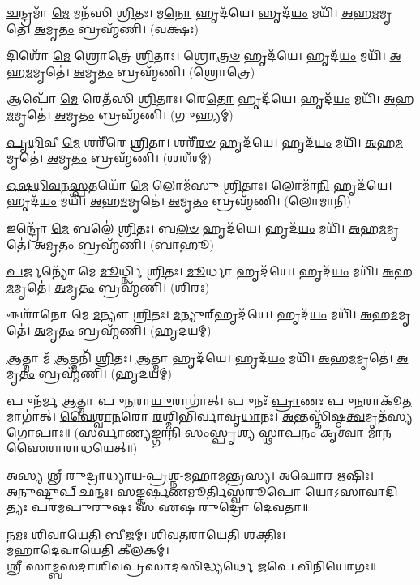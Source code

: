    \ul{𑌚}\-𑌨𑍍𑌦𑍍𑌰𑌮𑌾᳴ \ul{𑌮𑍇} 𑌮𑌨᳴𑌸𑌿 \ul{𑌶𑍍𑌰𑌿}\-𑌤𑌃।   𑌮\-\ul{𑌨𑍋} 𑌹𑍃𑌦᳴𑌯𑍇।   𑌹𑍃𑌦᳴\-\ul{𑌯𑌂} 𑌮𑌯𑌿᳴।   \ul{𑌅}\-𑌹\-\ul{𑌮}\-𑌮𑍃𑌤𑍇॑।   \ul{𑌅}\-𑌮𑍃\-\ul{𑌤𑌂} 𑌬𑍍𑌰𑌹𑍍𑌮᳴𑌣𑌿। (𑌵𑌕𑍍𑌷𑌃)

   𑌦𑌿𑌶𑍋᳴ \ul{𑌮𑍇} 𑌶𑍍𑌰𑍋𑌤𑍍𑌰𑍇॑ \ul{𑌶𑍍𑌰𑌿}\-𑌤𑌾𑌃।   𑌶𑍍𑌰𑍋\-\ul{𑌤𑍍𑌰}\-\-\ul{𑍞} 𑌹𑍃𑌦᳴𑌯𑍇।   𑌹𑍃𑌦᳴\-\ul{𑌯𑌂} 𑌮𑌯𑌿᳴।   \ul{𑌅}\-𑌹\-\ul{𑌮}\-𑌮𑍃𑌤𑍇॑।   \ul{𑌅}\-𑌮𑍃\-\ul{𑌤𑌂} 𑌬𑍍𑌰𑌹𑍍𑌮᳴𑌣𑌿। (𑌶𑍍𑌰𑍋𑌤𑍍𑌰𑍇)

   𑌆𑌪𑍋᳴ \ul{𑌮𑍇} 𑌰𑍇𑌤᳴𑌸𑌿 \ul{𑌶𑍍𑌰𑌿}\-𑌤𑌾𑌃।   𑌰𑍇\-\ul{𑌤𑍋} 𑌹𑍃𑌦᳴𑌯𑍇।   𑌹𑍃𑌦᳴\-\ul{𑌯𑌂} 𑌮𑌯𑌿᳴।   \ul{𑌅}\-𑌹\-\ul{𑌮}\-𑌮𑍃𑌤𑍇॑।   \ul{𑌅}\-𑌮𑍃\-\ul{𑌤𑌂} 𑌬𑍍𑌰𑌹𑍍𑌮᳴𑌣𑌿। (𑌗𑍁𑌹𑍍𑌯𑌮𑍍)

   \ul{𑌪𑍃}\-\-\ul{𑌥𑌿}\-𑌵𑍀 \ul{𑌮𑍇} 𑌶𑌰𑍀᳴𑌰𑍇 \ul{𑌶𑍍𑌰𑌿}\-𑌤𑌾।   𑌶𑌰𑍀᳴\-\ul{𑌰}\-\-\ul{𑍞} 𑌹𑍃𑌦᳴𑌯𑍇।   𑌹𑍃𑌦᳴\-\ul{𑌯𑌂} 𑌮𑌯𑌿᳴।   \ul{𑌅}\-𑌹\-\ul{𑌮}\-𑌮𑍃𑌤𑍇॑।   \ul{𑌅}\-𑌮𑍃\-\ul{𑌤𑌂} 𑌬𑍍𑌰𑌹𑍍𑌮᳴𑌣𑌿। (𑌶𑌰𑍀𑌰𑌮𑍍)

   \ul{𑌓}\-\-\ul{𑌷}\-\-\ul{𑌧𑌿}\-\-\ul{𑌵}\-\-\ul{𑌨}\-\-\ul{𑌸𑍍𑌪}\-𑌤𑌯𑍋᳴ \ul{𑌮𑍇} 𑌲𑍋𑌮᳴𑌸𑍁 \ul{𑌶𑍍𑌰𑌿}\-𑌤𑌾𑌃।   𑌲𑍋𑌮𑌾᳴\-\ul{𑌨𑌿} 𑌹𑍃𑌦᳴𑌯𑍇।   𑌹𑍃𑌦᳴\-\ul{𑌯𑌂} 𑌮𑌯𑌿᳴।   \ul{𑌅}\-𑌹\-\ul{𑌮}\-𑌮𑍃𑌤𑍇॑।   \ul{𑌅}\-𑌮𑍃\-\ul{𑌤𑌂} 𑌬𑍍𑌰𑌹𑍍𑌮᳴𑌣𑌿। (𑌲𑍋𑌮𑌾𑌨𑌿)

   𑌇𑌨𑍍𑌦𑍍𑌰𑍋᳴ \ul{𑌮𑍇} 𑌬𑌲𑍇॑ \ul{𑌶𑍍𑌰𑌿}\-𑌤𑌃।   𑌬\-\ul{𑌲}\-\-\ul{𑍞} 𑌹𑍃𑌦᳴𑌯𑍇।   𑌹𑍃𑌦᳴\-\ul{𑌯𑌂} 𑌮𑌯𑌿᳴।   \ul{𑌅}\-𑌹\-\ul{𑌮}\-𑌮𑍃𑌤𑍇॑।   \ul{𑌅}\-𑌮𑍃\-\ul{𑌤𑌂} 𑌬𑍍𑌰𑌹𑍍𑌮᳴𑌣𑌿। (𑌬𑌾𑌹𑍂)

   \ul{𑌪}\-𑌰𑍍𑌜𑌨𑍍𑌯𑍋᳴ 𑌮𑍇 \ul{𑌮𑍂}\-𑌰𑍍𑌧𑍍𑌨𑌿 \ul{𑌶𑍍𑌰𑌿}\-𑌤𑌃।   \ul{𑌮𑍂}\-𑌰𑍍𑌧𑌾 𑌹𑍃𑌦᳴𑌯𑍇।   𑌹𑍃𑌦᳴\-\ul{𑌯𑌂} 𑌮𑌯𑌿᳴।   \ul{𑌅}\-𑌹\-\ul{𑌮}\-𑌮𑍃𑌤𑍇॑।   \ul{𑌅}\-𑌮𑍃\-\ul{𑌤𑌂} 𑌬𑍍𑌰𑌹𑍍𑌮᳴𑌣𑌿। (𑌶𑌿𑌰𑌃)

   𑌈𑌶𑌾᳴𑌨𑍋 𑌮𑍇 \ul{𑌮}\-𑌨𑍍𑌯𑍗 \ul{𑌶𑍍𑌰𑌿}\-𑌤𑌃।   \ul{𑌮}\-𑌨𑍍𑌯𑍁𑌰𑍍‌𑌹𑍃𑌦᳴𑌯𑍇।   𑌹𑍃𑌦᳴\-\ul{𑌯𑌂} 𑌮𑌯𑌿᳴।    \ul{𑌅}\-𑌹\-\ul{𑌮}\-𑌮𑍃𑌤𑍇॑।   \ul{𑌅}\-𑌮𑍃\-\ul{𑌤𑌂} 𑌬𑍍𑌰𑌹𑍍𑌮᳴𑌣𑌿। (𑌹𑍃𑌦𑌯𑌮𑍍)

   \ul{𑌆}\-𑌤𑍍𑌮𑌾 𑌮᳴ \ul{𑌆}\-𑌤𑍍𑌮𑌨𑌿᳴ \ul{𑌶𑍍𑌰𑌿}\-𑌤𑌃।   \ul{𑌆}\-𑌤𑍍𑌮𑌾 𑌹𑍃𑌦᳴𑌯𑍇।   𑌹𑍃𑌦᳴\-\ul{𑌯𑌂} 𑌮𑌯𑌿᳴।   \ul{𑌅}\-𑌹\-\ul{𑌮}\-𑌮𑍃𑌤𑍇॑।   \ul{𑌅}\-𑌮𑍃\-\ul{𑌤𑌂} 𑌬𑍍𑌰𑌹𑍍𑌮᳴𑌣𑌿।
(𑌹𑍃𑌦𑌯𑌮𑍍)

   𑌪𑍁𑌨᳴𑌰𑍍𑌮 \ul{𑌆}\-𑌤𑍍𑌮𑌾 𑌪𑍁\-\ul{𑌨}\-𑌰𑌾\-\ul{𑌯𑍁}\-𑌰𑌾𑌗𑌾॑𑌤𑍍।   𑌪𑍁𑌨𑌃᳴ \ul{𑌪𑍍𑌰𑌾}\-𑌣𑌃 𑌪𑍁\-\ul{𑌨}\-𑌰𑌾𑌕𑍂᳴\-\ul{𑌤}\-𑌮𑌾𑌗𑌾॑𑌤𑍍।   \ul{𑌵𑍈}\-\-\ul{𑌶𑍍𑌵𑌾}\-\-\ul{𑌨}\-𑌰𑍋 \ul{𑌰}\-𑌶𑍍𑌮𑌿𑌭𑌿᳴𑌰𑍍𑌵𑌾𑌵𑍃\-\ul{𑌧𑌾}\-𑌨𑌃।   \ul{𑌅}\-𑌨𑍍𑌤𑌸𑍍𑌤𑌿᳴𑌷𑍍𑌠\-\ul{𑌤𑍍𑌵}\-𑌮𑍃𑌤᳴𑌸𑍍𑌯 \ul{𑌗𑍋}\-𑌪𑌾𑌃॥ (𑌸𑌰𑍍𑌵𑌾𑌣𑍍𑌯𑌙𑍍𑌗𑌾𑌨𑌿 𑌸𑌂𑌸𑍍𑌪𑍃𑌶𑍍𑌯 𑌸𑍍𑌥𑌾𑌪𑌨𑌂 𑌕𑍃𑌤𑍍𑌵𑌾 𑌮𑌾𑌨𑌸𑍈𑌰𑌾𑌰𑌾𑌧𑌯𑍇𑌤𑍍॥)
{\closesection}


𑌅𑌸𑍍𑌯 𑌶𑍍𑌰𑍀 𑌰𑍁𑌦𑍍𑌰𑌾𑌧𑍍𑌯𑌾𑌯-𑌪𑍍𑌰𑌶𑍍𑌨-𑌮𑌹𑌾𑌮𑌨𑍍𑌤𑍍𑌰𑌸𑍍𑌯। 𑌅𑌘𑍋𑌰 𑌋𑌷𑌿𑌃।\\
𑌅𑌨𑍁𑌷𑍍𑌟𑍁𑌪𑍍 𑌛𑌨𑍍𑌦𑌃। 𑌸𑌙𑍍𑌕𑌰𑍍𑌷𑌣𑌮𑍂𑌰𑍍𑌤𑌿𑌸𑍍𑌵𑌰𑍂𑌪𑍋 𑌯𑍋𑌽𑌸𑌾𑌵𑌾𑌦𑌿𑌤𑍍𑌯𑌃 𑌪𑌰𑌮𑌪𑍁𑌰𑍁𑌷𑌃 𑌸 𑌏𑌷 𑌰𑍁𑌦𑍍𑌰𑍋 𑌦𑍇𑌵𑌤𑌾॥

𑌨𑌮𑌃 𑌶𑌿𑌵𑌾𑌯𑍇𑌤𑌿 𑌬𑍀𑌜𑌮𑍍। 𑌶𑌿𑌵𑌤𑌰𑌾𑌯𑍇𑌤𑌿 𑌶𑌕𑍍𑌤𑌿𑌃।\\
𑌮𑌹𑌾𑌦𑍇𑌵𑌾𑌯𑍇𑌤𑌿 𑌕𑍀𑌲𑌕𑌮𑍍।\\
𑌶𑍍𑌰𑍀 𑌸𑌾𑌮𑍍𑌬𑌸𑌦𑌾𑌶𑌿𑌵𑌪𑍍𑌰𑌸𑌾𑌦𑌸𑌿𑌦𑍍𑌧𑍍𑌯𑌰𑍍𑌥𑍇 𑌜𑌪𑍇 𑌵𑌿𑌨𑌿𑌯𑍋𑌗𑌃॥\\


